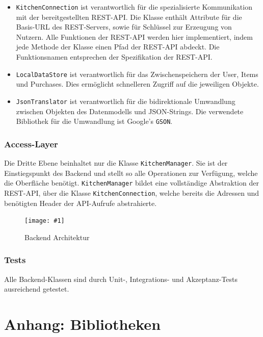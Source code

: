\documentclass{scrartcl}
\newcommand{\cfigure}[3]{%
\begin{figure}[ht]
	\centering
	\texttt{[image: \#1]}
	\caption{#2}{#3} %
\end{figure}
}
\begin{document}
	\begin{itemize}
		\item  \texttt{KitchenConnection} ist verantwortlich für die spezialisierte Kommunikation mit der bereitgestellten REST-API. Die Klasse enthält Attribute für die Basis-URL des REST-Servers, sowie für Schlüssel zur Erzeugung von Nutzern.
		Alle Funktionen der REST-API werden hier implementiert, indem jede Methode der Klasse einen Pfad der REST-API abdeckt.
		Die Funktionsnamen entsprechen der Spezifikation der REST-API\@.

		\item \texttt{LocalDataStore} ist verantwortlich für das Zwischenspeichern der User, Items und Purchases.
		Dies ermöglicht schnelleren Zugriff auf die jeweiligen Objekte.

		\item \texttt{JsonTranslator} ist verantwortlich für die bidirektionale Umwandlung zwischen Objekten des Datenmodells und JSON-Strings.
		Die verwendete Bibliothek für die Umwandlung ist Google's \texttt{GSON}.
	\end{itemize}

	\subsubsection{Access-Layer}

	Die Dritte Ebene beinhaltet nur die Klasse \texttt{KitchenManager}.
	Sie ist der Einstiegspunkt des Backend und stellt so alle Operationen zur Verfügung, welche die Oberfläche benötigt. \texttt{KitchenManager} bildet eine vollständige Abstraktion der REST-API, über die Klasse \texttt{KitchenConnection}, welche bereits die Adressen und benötigten Header der API-Aufrufe abstrahierte.

	\cfigure{figures/classStructure.png}{Backend Architektur}{\label{backendArchitecture}}

	\subsubsection{Tests}

	Alle Backend-Klassen sind durch Unit-, Integrations- und Akzeptanz-Tests ausreichend getestet.

	\section{Anhang: Bibliotheken}\label{sec:bib}

\end{document}
